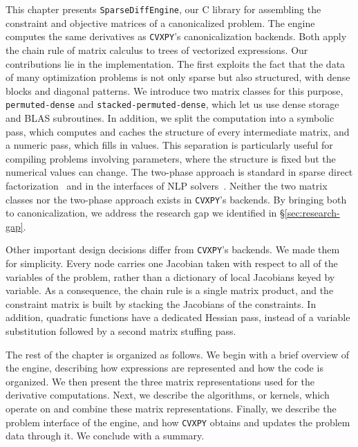 \label{sec:Theme1}

This chapter presents \texttt{SparseDiffEngine}, our C library for assembling the
constraint and objective matrices of a canonicalized problem. The engine computes the same
derivatives as \texttt{CVXPY}'s canonicalization backends. Both apply the
chain rule of matrix calculus to trees of vectorized expressions. Our contributions lie in the
implementation. The first exploits the fact that the data of many optimization
problems is not only sparse but also structured, with dense blocks and diagonal patterns.
We introduce two matrix classes for this purpose,
\texttt{permuted-dense} and \texttt{stacked-permuted-dense}, which let us use
dense storage and BLAS subroutines.
In addition, we split the computation into a symbolic pass, which computes and
caches the structure of every intermediate matrix, and a numeric pass, which fills in values.
This separation is particularly useful for compiling problems involving parameters, where
the structure is fixed but the numerical values can change. The two-phase approach is
standard in sparse direct factorization~\cite{davis2006direct} and in the interfaces of \ac{NLP}
solvers~\cite{wachter2006ipopt}.
Neither the two matrix classes nor the two-phase approach exists in \texttt{CVXPY}'s backends.
By bringing both to canonicalization, we address the research gap we identified
in \S\ref{sec:research-gap}.

Other important design decisions differ from \texttt{CVXPY}'s backends. We made them for
simplicity. Every node carries one Jacobian taken with respect to
all of the variables of the problem, rather than a dictionary of local Jacobians keyed by
variable. As a consequence, the chain rule is a single matrix product, and the
constraint matrix is built by stacking the Jacobians of the constraints.
In addition, quadratic functions have a dedicated Hessian pass, instead of a
variable substitution followed by a second matrix stuffing pass.

The rest of the chapter is organized as follows. We begin with a brief overview of
the engine, describing how expressions are represented and how the code is organized.
We then present the three matrix representations used for the derivative computations.
Next, we describe the
algorithms, or kernels, which operate on and combine these matrix representations.
Finally, we describe the problem interface of the engine, and how \texttt{CVXPY} obtains
and updates the problem data through it. We conclude with a summary.

